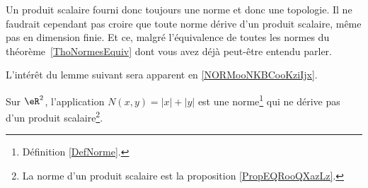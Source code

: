 \begin{normaltext}
    Un produit scalaire fourni donc toujours une norme et donc une topologie. Il ne faudrait cependant pas croire que toute norme dérive d'un produit scalaire, même pas en dimension finie. Et ce, malgré l'équivalence de toutes les normes du théorème~\ref{ThoNormesEquiv} dont vous avez déjà peut-être entendu parler.
\end{normaltext}


L'intérêt du lemme suivant sera apparent en \ref{NORMooNKBCooKziIjx}.
\begin{lemma}   \label{LEMooRWJYooOIJkZc}
    Sur \( \eR^2\), l'application \( N(x,y)=| x |+| y |\) est une norme\footnote{Définition \ref{DefNorme}.} qui ne dérive pas d'un produit scalaire\footnote{La norme d'un produit scalaire est la proposition  \ref{PropEQRooQXazLz}.}.
\end{lemma}

